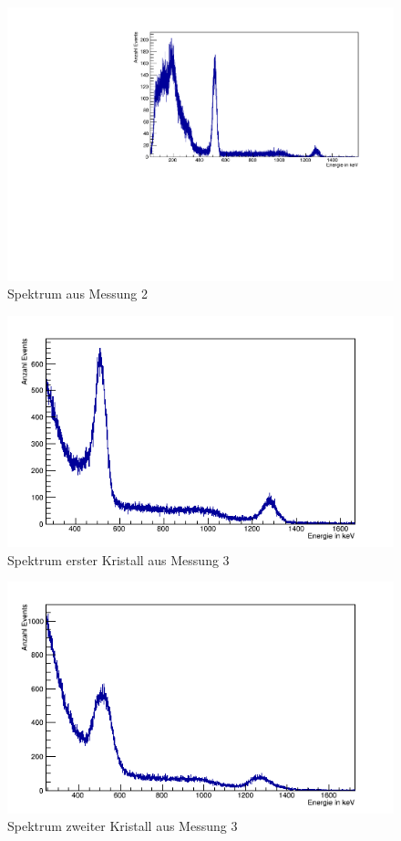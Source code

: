 \documentclass[a4paper,11pt,twoside]{article}
\begin{document}
\begin{figure}[htbp]
	\begin{center}
		\includegraphics[width=\textwidth]{Messung2.pdf}
		\caption{Spektrum aus Messung 2}
		
	\end{center}
\end{figure}
\begin{figure}[htbp]
	\begin{center}
		\includegraphics[width=\textwidth]{Messung31.png}
		\caption{Spektrum erster Kristall aus Messung 3}
		
	\end{center}
\end{figure}
\begin{figure}[htbp]
	\begin{center}
		\includegraphics[width=\textwidth]{Messung32.png}
		\caption{Spektrum zweiter Kristall aus Messung 3}
		
	\end{center}
\end{figure}


%
\end{document}
